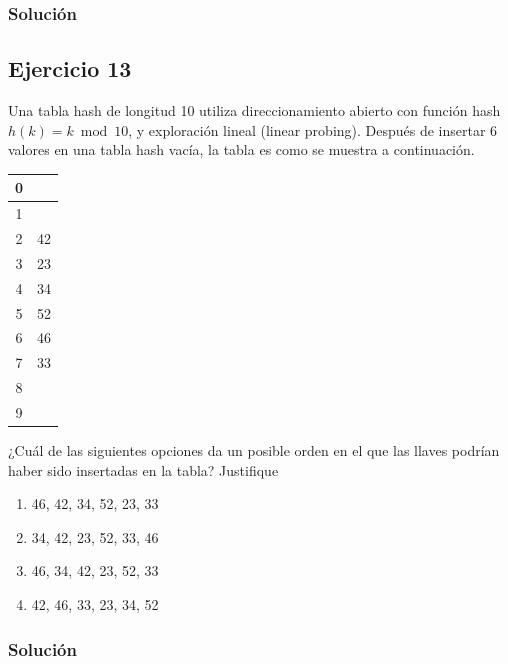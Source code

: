 \documentclass{article}
\begin{document}
\subsubsection*{Solución}


\subsection*{Ejercicio 13}
Una tabla hash de longitud 10 utiliza direccionamiento abierto con función hash $h(k)=k \bmod 10$, y exploración lineal (linear probing). Después de insertar 6 valores en una tabla hash vacía, la tabla es como se muestra a continuación.

\begin{tabular}{|c|c|}
    \hline
    0 &    \\ \hline
    1 &    \\ \hline
    2 & 42 \\ \hline
    3 & 23 \\ \hline
    4 & 34 \\ \hline
    5 & 52 \\ \hline
    6 & 46 \\ \hline
    7 & 33 \\ \hline
    8 &    \\ \hline
    9 &    \\ \hline
  \end{tabular}

¿Cuál de las siguientes opciones da un posible orden en el que las llaves podrían haber sido
insertadas en la tabla? Justifique
\begin{enumerate}[label=(\Alph*), ref=\Alph*]
    \item 46, 42, 34, 52, 23, 33
    \item 34, 42, 23, 52, 33, 46
    \item 46, 34, 42, 23, 52, 33
    \item 42, 46, 33, 23, 34, 52
\end{enumerate}
\subsubsection*{Solución}
\end{document}
